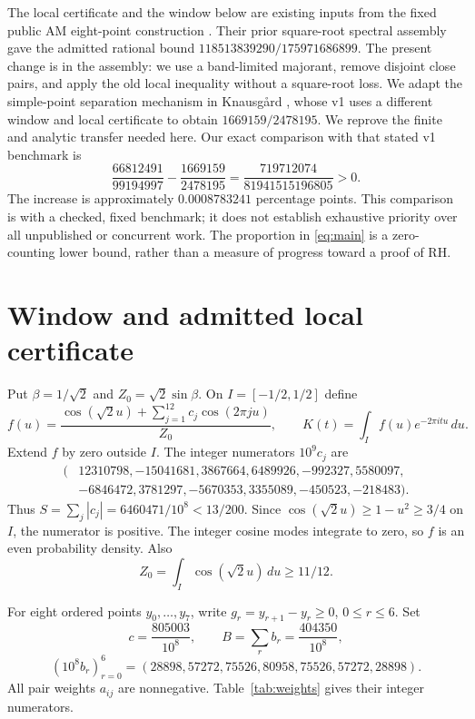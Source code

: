 \documentclass[11pt,a4paper]{article}
\theoremstyle{remark}
\newcommand{\I}{[-1/2,1/2]}
\begin{document}
The local certificate and the window below are existing inputs from
the fixed public AM eight-point construction \cite{PC8}.
Their prior square-root spectral assembly gave the admitted rational
bound $118513839290/175971686899$. The present change is in the
assembly: we use a band-limited majorant, remove disjoint close pairs,
and apply the old local inequality without a square-root loss.
We adapt the simple-point separation mechanism in Knausg{\aa}rd
\cite[Section~5]{Knaus}, whose v1 uses a different window and local
certificate to obtain $1669159/2478195$.
We reprove the finite and analytic transfer needed here.
Our exact comparison with that stated v1 benchmark is
\begin{equation}\label{eq:comparison}
 \frac{66812491}{99194997}-\frac{1669159}{2478195}
 =\frac{719712074}{81941515196805}>0.
\end{equation}
The increase is approximately $0.0008783241$ percentage points.
This comparison is with a checked, fixed benchmark; it does not
establish exhaustive priority over all unpublished or concurrent work.
The proportion in \eqref{eq:main} is a zero-counting lower bound,
rather than a measure of progress toward a proof of RH.

\section{Window and admitted local certificate}

Put $\beta=1/\sqrt2$ and $Z_0=\sqrt2\sin\beta$.
On $I=\I$ define
\begin{equation}\label{eq:window}
 f(u)=\frac{\cos(\sqrt2u)+\sum_{j=1}^{12}c_j\cos(2\pi ju)}{Z_0},
 \qquad K(t)=\int_I f(u)e^{-2\pi itu}\,du.
\end{equation}
Extend $f$ by zero outside $I$. The integer numerators $10^9c_j$ are
\[
\begin{split}
(&12310798,-15041681,3867664,6489926,-992327,5580097,\\
 &-6846472,3781297,-5670353,3355089,-450523,-218483).
\end{split}
\]
Thus $S=\sum_j|c_j|=6460471/10^8<13/200$.
Since $\cos(\sqrt2u)\ge1-u^2\ge3/4$ on $I$, the numerator
is positive. The integer cosine modes integrate to zero, so
$f$ is an even probability density. Also
\begin{equation}\label{eq:normalization}
 Z_0=\int_I\cos(\sqrt2u)\,du\ge 11/12.
\end{equation}

For eight ordered points $y_0,\ldots,y_7$, write
$g_r=y_{r+1}-y_r\ge0$, $0\le r\le6$. Set
\[
 c=\frac{805003}{10^8},\qquad B=\sum_rb_r=\frac{404350}{10^8},
\]
\[
 (10^8b_r)_{r=0}^6=(28898,57272,75526,80958,75526,57272,28898).
\]
All pair weights $a_{ij}$ are nonnegative. Table~\ref{tab:weights}
gives their integer numerators.
\end{document}
